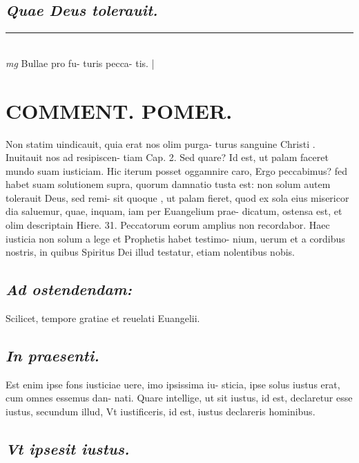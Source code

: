 \documentclass{article}
\begin{document}
\begin{pages}
\subsection*{\textit{Quae Deus tolerauit. }}
\vspace{0.5cm}\noindent
\vspace{0.2cm}\rule{1cm}{0.2pt}\\ 
\hspace{0.2cm}\textit{mg}
\footnotesize Bullae pro fu- turis pecca- tis. 
\normalsize| 
\section*{COMMENT. POMER.  }\pstart Non statim uindicauit, quia erat nos olim purga- turus sanguine Christi . Inuitauit nos ad resipiscen- tiam Cap. 2. Sed quare?  \pend\pstart Id est, ut palam faceret mundo suam iusticiam.  Hic iterum posset oggamnire caro, Ergo peccabimus? fed habet suam solutionem supra, quorum damnatio tusta est: non solum autem tolerauit Deus, sed remi- sit quoque , ut palam fieret, quod ex sola eius misericor dia saluemur, quae, inquam, iam per Euangelium prae- dicatum, ostensa est, et olim descriptain Hiere. 31.  Peccatorum eorum amplius non recordabor. Haec iusticia non solum a lege et Prophetis habet testimo- nium, uerum et a cordibus nostris, in quibus Spiritus Dei illud testatur, etiam nolentibus nobis.   \pend
{}
{}
\subsection*{\textit{Ad ostendendam: }}\pstart Scilicet, tempore gratiae et reuelati Euangelii.  \pend
{}
{}
\subsection*{\textit{In praesenti. }}\pstart Est enim ipse fons iusticiae uere, imo ipsissima iu- sticia, ipse solus iustus erat, cum omnes essemus dan- nati. Quare intellige, ut sit iustus, id est, declaretur esse iustus, secundum illud, Vt iustificeris, id est, iustus declareris hominibus.   \pend
{}
{}
\subsection*{\textit{Vt ipsesit iustus. }}
{}

\end{pages}
\end{document}
